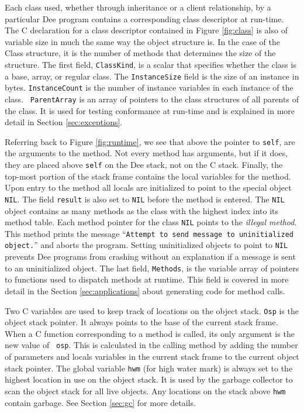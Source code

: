 Each class used, whether through inheritance or a client relationship,
by a particular Dee program contains a corresponding class descriptor
at run-time.  The C declaration for a class descriptor contained in
Figure \ref{fig:class} is also of variable size in much the same way
the object structure is.  In the case of the Class structure, it is
the number of methods that determines the size of the structure.  The
first field, {\tt ClassKind}, is a scalar that specifies whether the
class is a base, array, or regular class.  The {\tt InstanceSize}
field is the size of an instance in bytes.  {\tt InstanceCount} is the
number of instance variables in each instance of the class.  {\tt
ParentArray} is an array of pointers to the class structures of all
parents of the class.  It is used for testing conformance at run-time
and is explained in more detail in Section \ref{sec:exceptions}.

Referring back to Figure \ref{fig:runtime}, we see that above the
pointer to {\tt self}, are the arguments to the method.  Not every
method has arguments, but if it does, they are placed above {\tt self}
on the Dee stack, not on the C stack.  Finally, the top-most portion
of the stack frame contains the local variables for the method.  Upon
entry to the method all locals are initialized to point to the special
object {\tt NIL}.  The field {\tt result} is also set to {\tt NIL}
before the method is entered.  The {\tt NIL} object contains as many
methods as the class with the highest index into its method table.
Each method pointer for the class {\tt NIL} points to the {\em illegal
method}.  This method prints the message ``{\tt Attempt to send
message to uninitialized object.}'' and aborts the program.  Setting
uninitialized objects to point to {\tt NIL} prevents Dee programs from
crashing without an explanation if a message is sent to an
uninitialized object.  The last field, {\tt Methods}, is the variable
array of pointers to functions used to dispatch methods at runtime.
This field is covered in more detail in the Section
\ref{sec:applications} about generating code for method calls.

Two C variables are used to keep track of locations on the object
stack.  {\tt Osp} is the object stack pointer.  It always points to
the base of the current stack frame.  When a C function corresponding
to a method is called, its only argument is the new value of {\tt
osp}.  This is calculated in the calling method by adding the number
of parameters and locals variables in the current stack frame to the
current object stack pointer.  The global variable {\tt hwm} (for high
water mark) is always set to the highest location in use on the object
stack.  It is used by the garbage collector to scan the object stack
for all live objects.  Any locations on the stack above {\tt hwm}
contain garbage.  See Section \ref{sec:gc} for more details.

